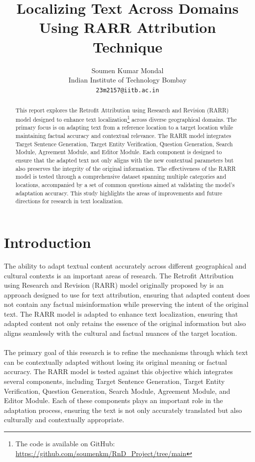 \documentclass[11pt]{article}
\title{Localizing Text Across Domains Using RARR Attribution Technique}
\author{Soumen Kumar Mondal \\
	Indian Institute of Technology Bombay \\
	\texttt{23m2157@iitb.ac.in} \\}
\begin{document}
	\maketitle
	\thispagestyle{fancy}
	\begin{abstract}
		This report explores the Retrofit Attribution using Research and Revision (RARR) model designed to enhance text localization\footnote{The code is available on GitHub: \url{https://github.com/soumenkm/RnD_Project/tree/main}} across diverse geographical domains. The primary focus is on adapting text from a reference location to a target location while maintaining factual accuracy and contextual relevance. The RARR model integrates Target Sentence Generation, Target Entity Verification, Question Generation, Search Module, Agreement Module, and Editor Module. Each component is designed to ensure that the adapted text not only aligns with the new contextual parameters but also preserves the integrity of the original information. The effectiveness of the RARR model is tested through a comprehensive dataset spanning multiple categories and locations, accompanied by a set of common questions aimed at validating the model's adaptation accuracy. This study highlights the areas of improvements and future directions for research in text localization.
	\end{abstract}
	
	\section{Introduction}
	The ability to adapt textual content accurately across different geographical and cultural contexts is an important areas of research. The Retrofit Attribution using Research and Revision (RARR) model originally proposed by \cite{gao2023rarr} is an approach designed to use for text attribution, ensuring that adapted content does not contain any factual misinformation while preserving the intent of the original text. The RARR model is adapted to enhance text localization, ensuring that adapted content not only retains the essence of the original information but also aligns seamlessly with the cultural and factual nuances of the target location.
	
	\paragraph{}The primary goal of this research is to refine the mechanisms through which text can be contextually adapted without losing its original meaning or factual accuracy. The RARR model is tested against this objective which integrates several components, including Target Sentence Generation, Target Entity Verification, Question Generation, Search Module, Agreement Module, and Editor Module. Each of these components plays an important role in the adaptation process, ensuring the text is not only accurately translated but also culturally and contextually appropriate.
	
\end{document}
